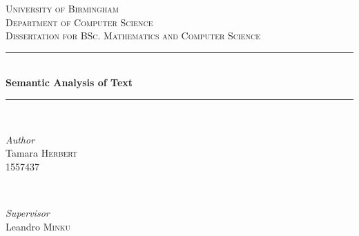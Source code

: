 \documentclass[11pt]{article}
\begin{document}

\begin{titlepage} %
	\newcommand{\HRule}{\rule{\linewidth}{0.5mm}} %
	
	\center %
	
	
	\textsc{\LARGE University of Birmingham}\\[1.5cm] %
	
	\textsc{\Large Department of Computer Science}\\[0.5cm] %
	
	\textsc{\large Dissertation for BSc. Mathematics and Computer Science}\\[0.5cm] %
	
	
	\HRule\\[0.4cm]
	
	{\huge\bfseries Semantic Analysis of Text}\\[0.4cm] %
	
	\HRule\\[1.5cm]
	
	
	\begin{minipage}{0.4\textwidth}
		\begin{flushleft}
			\large
			\textit{Author}\\
			Tamara \textsc{Herbert} \\
			1557437%
		\end{flushleft}
	\end{minipage}
	~
	\begin{minipage}{0.4\textwidth}
		\begin{flushright}
			\large
			\textit{Supervisor}\\
			Leandro \textsc{Minku} %
		\end{flushright}
	\end{minipage}
	

\end{titlepage}
\end{document}
